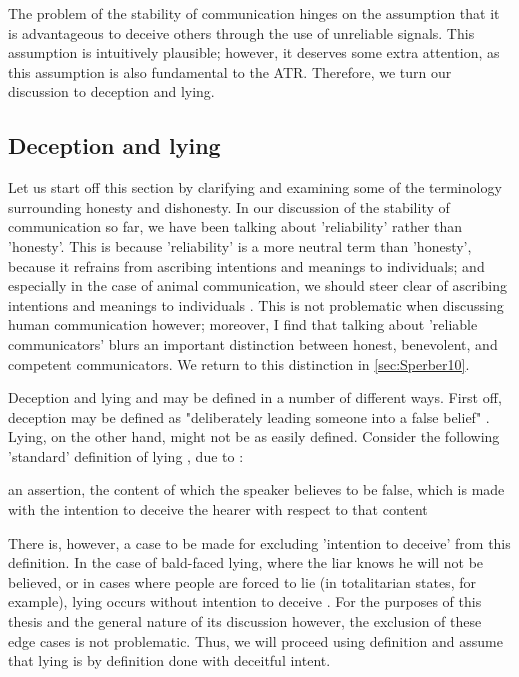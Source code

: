 The problem of the stability of communication hinges on the assumption that it is advantageous to deceive others through the use of unreliable signals. This assumption is intuitively plausible; however, it deserves some extra attention, as this assumption is also fundamental to the ATR. Therefore, we turn our discussion to deception and lying.

\subsection{Deception and lying}
\label{sec:deception}

Let us start off this section by clarifying and examining some of the terminology surrounding honesty and dishonesty.
In our discussion of the stability of communication so far, we have been talking about 'reliability' rather than 'honesty'. This is because 'reliability' is a more neutral term than 'honesty', because it refrains from ascribing intentions and meanings to individuals; and especially in the case of animal communication, we should steer clear of ascribing intentions and meanings to individuals \citep{Scott-Phillips08}.
This is not problematic when discussing human communication however; moreover, I find that talking about 'reliable communicators' blurs an important distinction between honest, benevolent, and competent communicators. We return to this distinction in \cref{sec:Sperber10}.

Deception and lying and may be defined in a number of different ways.
First off, deception may be defined as "deliberately leading someone into a false belief" \citep[p.~358]{Meibauer18}.
Lying, on the other hand, might not be as easily defined. Consider the following 'standard' definition of lying \citep{Meibauer18}, due to \citet{Williams02}:
\begin{quoting}
    an assertion, the content of which the speaker believes to be false, which is made with the intention to deceive the hearer with respect to that content
    \hfill \citep[p.~96]{Williams02}
\end{quoting}
There is, however, a case to be made for excluding 'intention to deceive' from this definition. In the case of bald-faced lying, where the liar knows he will not be believed, or in cases where people are forced to lie (in totalitarian states, for example), lying occurs without intention to deceive \citep[\S 1.5]{Saul12}.
For the purposes of this thesis and the general nature of its discussion however, the exclusion of these edge cases is not problematic. Thus, we will proceed using  definition and assume that lying is by definition done with deceitful intent.

